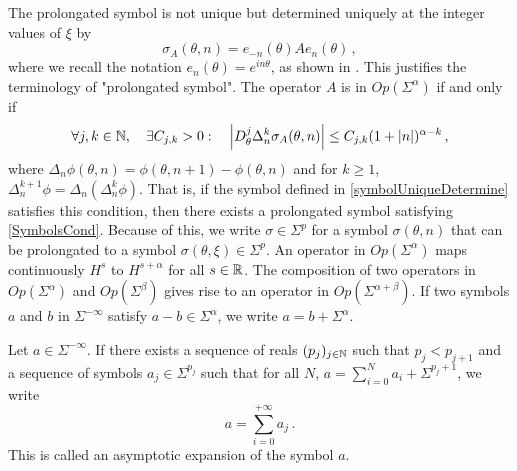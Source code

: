 \documentclass[a4paper]{article}
\begin{document}
The prolongated symbol is not unique but determined uniquely at the integer values of $\xi$ by 
\begin{equation}
	\label{symbolUniqueDetermine}
	\sigma_A(\theta,n) =  e_{-n}(\theta)Ae_n(\theta)\,,
\end{equation}
where we recall the notation $e_n(\theta) = e^{in\theta}$, as shown in \cite{thrunen1998symbol}. This justifies the terminology of "prolongated symbol". The operator $A$ is in $\textit{Op}(\Sigma^\alpha)$ if and only if
\[\forall j,k \in \mathbb{N}, \quad  \exists C_{j,k} > 0 :\quad  \left\lvert D_\theta^j \Delta_n^k \sigma_A(\theta,n) \right\rvert \leq C_{j,k}(1 + \left\lvert n \right\rvert)^{\alpha - k}\,,\] 
where $\Delta_n \phi(\theta,n) = \phi(\theta,n+1) - \phi(\theta,n)$ and for $k \geq 1$, $\Delta^{k+1}_n\phi = \Delta_n (\Delta^k_n \phi)$. That is, if the symbol defined in \eqref{symbolUniqueDetermine} satisfies this condition, then there exists a prolongated symbol satisfying \eqref{SymbolsCond}. Because of this, we write $\sigma \in \Sigma^p$ for a symbol $\sigma(\theta,n)$ that can be prolongated to a symbol ${\sigma}(\theta,\xi) \in \Sigma^p$. An operator in $\textit{Op}(\Sigma^\alpha)$ maps continuously $H^s$ to $H^{s + \alpha}$ for all $s \in \mathbb{R}$. The composition of two operators in $\textit{Op}(\Sigma^\alpha)$ and $\textit{Op}(\Sigma^\beta)$ gives rise to an operator in $\textit{Op}(\Sigma^{\alpha+\beta})$. 
If two symbols $a$ and $b$ in $\Sigma^{- \infty}$ satisfy $a - b  \in \Sigma^{\alpha}$, we write $a = b + \Sigma^\alpha$. 
\begin{Def}
	Let $a \in \Sigma^{- \infty}$. If there exists a sequence of reals $(p_j)_{j \in \mathbb{N}}$ such that $p_j < p_{j+1}$ and a sequence of symbols $a_j \in \Sigma^{p_j}$ such that for all $N$, $a = \sum_{i = 0}^{N}a_i + \Sigma^{p_j + 1}$, we write 
	\[a = \sum_{i = 0}^{+ \infty} a_j \,.\]
	This is called an asymptotic expansion of the symbol $a$. 
\end{Def}
\end{document}
